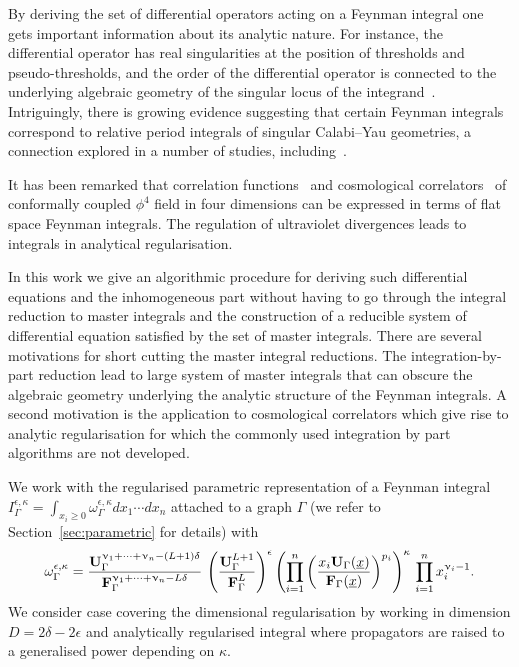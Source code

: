 \documentclass[a4paper,12pt]{article}
\numberwithin{equation}{section}
\numberwithin{figure}{section}
\begin{document}
\medskip
By deriving the set of differential operators acting on a Feynman integral one
gets important information about its analytic nature. For instance, 
the differential  operator has real singularities at the position of
 thresholds and pseudo-thresholds, and the order of the differential
operator is connected to the underlying algebraic geometry of the singular locus
of the integrand~\cite{Doran:2023yzu}. Intriguingly, there is  growing evidence suggesting that certain
Feynman integrals correspond to relative period integrals of singular
Calabi--Yau geometries, a connection explored in a number
of studies,
including~\cite{Brown:2009ta,Bloch:2014qca,Bloch:2016izu,Bourjaily:2018ycu,Bourjaily:2019hmc,Bourjaily:2018yfy,Klemm:2019dbm,Bonisch:2020qmm,Bonisch:2021yfw,Bourjaily:2022bwx,Forum:2022lpz,Duhr:2022pch,Frellesvig:2023PM,Pogel:2023zyd}.

It has been remarked that correlation
functions~\cite{Heckelbacher:2022hbq}
and cosmological correlators~\cite{Heckelbacher:2022fbx,Chowdhury:2023arc}
of conformally
coupled $\phi^4$ field in four dimensions can be expressed in terms of
flat space Feynman integrals.  The regulation of ultraviolet
divergences leads to integrals in analytical regularisation.

In this work we give an algorithmic procedure for deriving such
differential equations and the inhomogeneous part without having to go through the integral
reduction to master integrals and the construction of a reducible
system of differential equation satisfied by the set of master
integrals.  There are several motivations for short cutting the master
integral reductions. The integration-by-part reduction lead to large
system of master integrals that can obscure the algebraic
geometry underlying the analytic
structure of the Feynman integrals.
A second motivation is the application to
cosmological correlators which give rise to analytic regularisation
for which the commonly used integration by part algorithms are not  developed. 

We work with the regularised parametric representation of a Feynman integral $
I_\Gamma^{\epsilon,\kappa}=\int_{x_i\geq0}  \omega_\Gamma^{\epsilon,\kappa} dx_1\cdots dx_n$ attached to a
graph $\Gamma$ (we refer to 
Section~\ref{sec:parametric} for details)
with
\begin{equation}\label{e:OmegaAnRegIntro}
  \omega^{\epsilon,\kappa}_\Gamma = { \textbf{U}_\Gamma ^{\upnu_1+\cdots+\upnu_n-(L+1)\delta}  \over \textbf{F}_\Gamma ^{\upnu_1+\cdots+\upnu_n-L\delta} }\, \left(\textbf{U}_\Gamma^{L+1}\over \textbf{F}_\Gamma^{L}\right)^{\epsilon} 
  \left(\prod_{i=1}^n \left(x_i \textbf{U}_\Gamma(\underline x)\over
      \textbf{F}_\Gamma(\underline x)\right)^{p_i}\right)^{\kappa} \, \prod_{i=1}^n x_i^{\upnu_i-1} .
\end{equation}
We consider case covering
the dimensional regularisation by working in dimension
$D=2\delta-2\epsilon$ and analytically regularised integral where
propagators are raised to a generalised power depending on $\kappa$.
\end{document}
